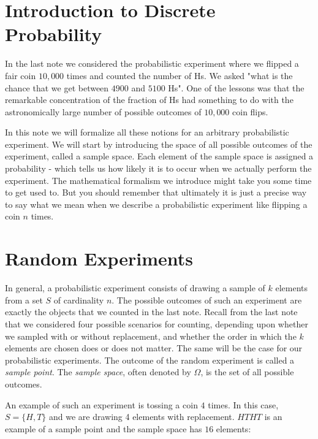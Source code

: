 \documentclass[11pt,fleqn]{article}
\begin{document}
\maketitle

\section*{Introduction to Discrete Probability}

In the last note we considered the probabilistic experiment where we flipped a fair coin $10,000$ times
and counted the number of Hs. We asked "what is the chance that we get between $4900$ and $5100$ 
Hs". One of the lessons was that the remarkable concentration of the fraction of Hs had something to do 
with the astronomically large number of possible outcomes of $10,000$ coin flips. 

In this note we will formalize all these notions for an arbitrary probabilistic experiment. We will start by 
introducing the space of all possible outcomes of the experiment, called a sample space. Each element 
of the sample space is assigned a probability - which tells us how likely it is to occur when we actually 
perform the experiment. The mathematical formalism we introduce might take you some time to get 
used to. But you should remember that ultimately it is just a precise way to say what we mean when we
describe a probabilistic experiment like flipping a coin $n$ times.

\section*{Random Experiments}
In general, a probabilistic experiment consists of drawing a sample of $k$ elements from a 
set $S$ of cardinality $n$. The possible outcomes of such an experiment are exactly the 
objects that we counted in the last note. Recall from the last note that we considered four
possible scenarios for counting, depending upon whether we sampled with or without 
replacement, and whether the order in which the $k$ elements are chosen does or does
not matter. The same will be the case for our probabilistic experiments. 
The outcome of the random experiment is called a
{\em sample point}. The
{\em sample space}, often denoted by $\Omega$, is the set of all
possible outcomes. 

An example of such an
experiment is tossing a coin $4$ times.
In this case, $S = \{H,T\}$ and we are drawing
4 elements with replacement.
$HTHT$ is an example of a sample point and
the sample space has $16$
elements:
\end{document}

